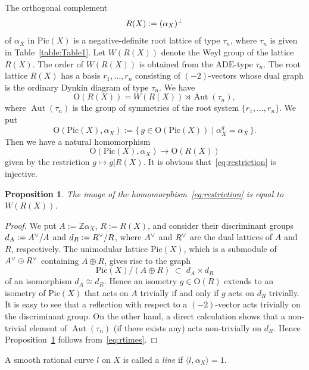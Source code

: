 \documentclass{math}
\theoremstyle{plain}
\newtheorem{proposition}[theorem]{Proposition}
\numberwithin{equation}{section}
\newcommand{\ZZ}{\mathord{\mathbb Z}}
\newcommand{\set}[2]{\{\,{#1}\mid {#2} \,\}}
\newcommand{\dual}{\sp{\vee}}
\newcommand{\sperp}{\sp{\perp}}
\DeclareMathOperator{\Aut}{Aut}
\newcommand{\OG}{\mathord{\mathrm{O}}}
\newcommand{\intf}[1]{\langle #1 \rangle}
\newcommand{\ADE}{\mathrm{ADE}}
\newcommand{\Pic}{\mathrm{Pic}}
\begin{document}
%
The orthogonal complement 
\[
R(X):=(\alpha_{X})\sperp
\]
of $\alpha_{X}$ in $\Pic(X)$ 
is a negative-definite root lattice of type $\tau_n$,
where $\tau_n$ is given in Table~\ref{table:Table1}.
Let $W(R(X))$ denote the Weyl group of the lattice $R(X)$.
The order of $W(R(X))$ is obtained  from the $\ADE$-type $\tau_n$.
The root lattice $R(X)$
has a basis $r_1, \dots, r_n$ 
consisting of $(-2)$-vectors 
whose dual graph is the ordinary Dynkin diagram of type $\tau_n$.
We have 
%
\begin{equation}\label{eq:rtimes}
\OG(R(X))=W(R(X))\rtimes \Aut(\tau_n),
\end{equation}
%
where $\Aut(\tau_n)$ is  the group of symmetries  of 
the root system  
$\{r_1, \dots, r_n\}$. %
We put
\[
\OG(\Pic(X), \alpha_{X}):=\set{g\in \OG(\Pic(X))}{\alpha_{X}^g=\alpha_{X}}.
\]
Then we have a natural  homomorphism
%
\begin{equation}\label{eq:restriction}
\OG(\Pic(X), \alpha_{X}) \to \OG(R(X))
\end{equation}
%
given by the restriction $g\mapsto g|R(X)$.
It is obvious that~\eqref{eq:restriction} is injective.
%
\begin{proposition}\label{prop:imageisW}
The image of the homomorphism~\eqref{eq:restriction} is equal to $W(R(X))$.
\end{proposition}
%
\begin{proof}
We put $A:=\ZZ\alpha_{X}$, $R:=R(X)$, and consider 
their discriminant groups 
$d_A:=A\dual/A$ and  $d_R:=R\dual/R$,
where $A\dual$ and $R\dual$ are 
the dual lattices of $A$ and $R$, respectively.
The unimodular lattice $\Pic(X)$,
which is a submodule of $A\dual \oplus R\dual$
containing $A\oplus R$,
gives rise to the graph 
\[
\Pic(X)/(A\oplus R)\;\subset\; d_A\times d_R
\] 
of an isomorphism $d_A\cong d_R$.
Hence 
an isometry $g\in \OG(R)$ extends to 
an isometry 
of $\Pic(X)$ that acts on $A$ trivially
if and only if 
$g$ acts on $d_R$ trivially.
It is easy to see that a reflection with respect to a $(-2)$-vector acts trivially on the discriminant group.
On the other hand, 
a direct calculation shows that a  non-trivial element of $\Aut(\tau_n)$ (if there exists any) acts
 non-trivially on $d_R$.
 Hence Proposition~\ref{prop:imageisW} follows from~\eqref{eq:rtimes}.
\end{proof}
%
%
A smooth rational curve $l$ on $X$ is called a \emph{line} if $\intf{l, \alpha_{X}}=1$.
\end{document}

